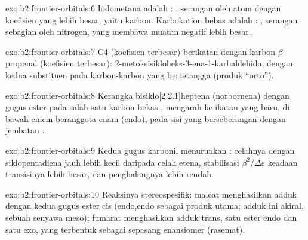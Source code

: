 \begin{solution}{exo:b2:frontier-orbitals:6}
Iodometana adalah : , serangan oleh atom
dengan koefisien  yang lebih besar, yaitu karbon. Karbokation bebas
adalah : , serangan sebagian oleh nitrogen,
yang membawa muatan negatif lebih besar.
\end{solution}

\begin{solution}{exo:b2:frontier-orbitals:7}
C4  (koefisien  terbesar) berikatan dengan karbon $\beta$ propenal
(koefisien  terbesar): 2-metoksisikloheks-3-ena-1-karbaldehida, dengan
kedua substituen pada karbon-karbon yang bertetangga (produk ``orto'').
\end{solution}

\begin{solution}{exo:b2:frontier-orbitals:8}
Kerangka bisiklo[2.2.1]heptena (norbornena) dengan gugus ester pada salah
satu karbon bekas , mengarah ke ikatan  yang baru, di bawah
cincin beranggota enam (endo), pada sisi yang berseberangan dengan jembatan
.
\end{solution}

\begin{solution}{exo:b2:frontier-orbitals:9}
Kedua gugus karbonil menurunkan  : celahnya dengan 
siklopentadiena jauh lebih kecil daripada celah etena, stabilisasi
$\beta^2/\Delta\varepsilon$ keadaan transisinya lebih besar, dan penghalangnya
lebih rendah.
\end{solution}

\begin{solution}{exo:b2:frontier-orbitals:10}
Reaksinya stereospesifik: maleat menghasilkan adduk dengan kedua gugus ester
cis (endo,endo sebagai produk utama; adduk ini akiral, sebuah senyawa meso);
fumarat menghasilkan adduk trans, satu ester endo dan satu exo, yang
terbentuk sebagai sepasang enansiomer (rasemat).
\end{solution}

